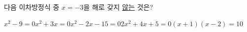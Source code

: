 다음 이차방정식 중 $x=-3$을 해로 갖지 \underline{않는} 것은?
\begin{choicesii}{$x^2-9=0$}{$x^2+3x=0$}{$x^2-2x-15=0$}{$2x^2+4x+5=0$}{$(x+1)(x-2)=10$}\end{choicesii}

